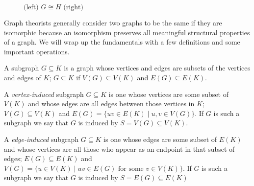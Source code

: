 \begin{figure}[H]
\begin{center}
\end{center}
    \caption{$\text{(left) }G\cong H \text{ (right)}$}
    \label{fig:isomorphismexample}

\end{figure}

Graph theorists generally consider two graphs to be the same if they are isomorphic because an isomorphism preserves all meaningful structural properties of a graph. We will wrap up the fundamentals with a few definitions and some important operations.

\begin{definition}[Subgraph] A subgraph $G\subseteq K$ is a graph whose vertices and edges are subsets of the vertices and edges of $K$; $G\subseteq K$ if $V(G)\subseteq V(K)$ and $E(G)\subseteq E(K)$.
\end{definition}


\begin{definition} A \textit{vertex-induced} subgraph $G\subseteq K$ is one whose vertices are some subset of $V(K)$ and whose edges are all edges between those vertices in $K$; $V(G)\subseteq V(K)$ and $E(G)=\{uv\in E(K)\mid u,v\in V(G)\}$. If $G$ is such a subgraph we say that $G$ is induced by $S=V(G)\subseteq V(K)$.
\end{definition}
\begin{definition} A \textit{edge-induced} subgraph $G\subseteq K$ is one whose edges are some subset of $E(K)$ and whose vertices are all those who appear as an endpoint in that subset of edges; $E(G)\subseteq E(K)$ and $V(G)=\{u\in V(K)\mid uv\in E(G)\text{ for some }v\in V(K)\}$. If $G$ is such a subgraph we say that $G$ is induced by $S=E(G)\subseteq E(K)$
\end{definition}

